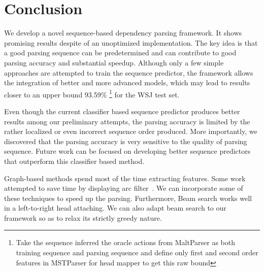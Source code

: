 \section{Conclusion}
We develop a novel sequence-based dependency parsing
framework. It shows promising results despite of an unoptimized
implementation.
The key idea is that a good parsing sequence can be predetermined
and can contribute to good parsing accuracy and substantial
speedup. Although only a few simple approaches are attempted
to train the sequence predictor, the framework allows the integration
of better and more advanced models,
which may lead to results closer to an upper bound 93.59\% \footnote{Take the sequence inferred the oracle actions from MaltParser as both training sequence and parsing sequence and define only first and second order features in MSTParser for head mapper to get this raw bound} for the WSJ test set.

Even though the current classifier based sequence predictor
produces better results among our preliminary attempts,
the parsing accuracy is limited by the
rather localized or even incorrect sequence order produced.
More importantly, we discovered that the parsing accuracy is very
sensitive to the quality of parsing sequence. Future work
can be focused on developing better sequence predictors that
outperform this classifier based method.

Graph-based methods spend most of the time extracting features.
Some work attempted to save time by displaying arc
filter~\cite{bergsma2010fast,rush2012vine}. We can incorporate some of these
techniques to speed up the parsing. Furthermore, Beam search works well in a
left-to-right head attaching. We can also adapt beam search to
our framework so as to relax its strictly greedy nature.
